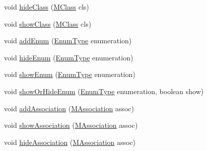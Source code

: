 \begin{DoxyCompactItemize}
\item 
void \hyperlink{classorg_1_1tzi_1_1use_1_1gui_1_1views_1_1diagrams_1_1classdiagram_1_1_class_diagram_a1577fd44a47429ed6e9f887f0862f0fa}{hide\-Class} (\hyperlink{interfaceorg_1_1tzi_1_1use_1_1uml_1_1mm_1_1_m_class}{M\-Class} cls)
\item 
void \hyperlink{classorg_1_1tzi_1_1use_1_1gui_1_1views_1_1diagrams_1_1classdiagram_1_1_class_diagram_a5be2f5b33a7a273dd7f2de6129a96c01}{show\-Class} (\hyperlink{interfaceorg_1_1tzi_1_1use_1_1uml_1_1mm_1_1_m_class}{M\-Class} cls)
\item 
void \hyperlink{classorg_1_1tzi_1_1use_1_1gui_1_1views_1_1diagrams_1_1classdiagram_1_1_class_diagram_a9186d695f60b6918f1328a4335e249bc}{add\-Enum} (\hyperlink{classorg_1_1tzi_1_1use_1_1uml_1_1ocl_1_1type_1_1_enum_type}{Enum\-Type} enumeration)
\item 
void \hyperlink{classorg_1_1tzi_1_1use_1_1gui_1_1views_1_1diagrams_1_1classdiagram_1_1_class_diagram_a3c12c7ce76b989ee03f865eade3e6d64}{hide\-Enum} (\hyperlink{classorg_1_1tzi_1_1use_1_1uml_1_1ocl_1_1type_1_1_enum_type}{Enum\-Type} enumeration)
\item 
void \hyperlink{classorg_1_1tzi_1_1use_1_1gui_1_1views_1_1diagrams_1_1classdiagram_1_1_class_diagram_a619da45fe25f8e7750393458f593e2c1}{show\-Enum} (\hyperlink{classorg_1_1tzi_1_1use_1_1uml_1_1ocl_1_1type_1_1_enum_type}{Enum\-Type} enumeration)
\item 
void \hyperlink{classorg_1_1tzi_1_1use_1_1gui_1_1views_1_1diagrams_1_1classdiagram_1_1_class_diagram_a58ba8a024fa94b14a9a02530dfb44671}{show\-Or\-Hide\-Enum} (\hyperlink{classorg_1_1tzi_1_1use_1_1uml_1_1ocl_1_1type_1_1_enum_type}{Enum\-Type} enumeration, boolean show)
\item 
void \hyperlink{classorg_1_1tzi_1_1use_1_1gui_1_1views_1_1diagrams_1_1classdiagram_1_1_class_diagram_adb6a9c8e5d9d201b14aa9b5af858f851}{add\-Association} (\hyperlink{interfaceorg_1_1tzi_1_1use_1_1uml_1_1mm_1_1_m_association}{M\-Association} assoc)
\item 
void \hyperlink{classorg_1_1tzi_1_1use_1_1gui_1_1views_1_1diagrams_1_1classdiagram_1_1_class_diagram_a0795854bd30efcd4add8bf47adc6819e}{show\-Association} (\hyperlink{interfaceorg_1_1tzi_1_1use_1_1uml_1_1mm_1_1_m_association}{M\-Association} assoc)
\item 
void \hyperlink{classorg_1_1tzi_1_1use_1_1gui_1_1views_1_1diagrams_1_1classdiagram_1_1_class_diagram_a7f3bad6b85bbe8905d510a8d8c51068e}{hide\-Association} (\hyperlink{interfaceorg_1_1tzi_1_1use_1_1uml_1_1mm_1_1_m_association}{M\-Association} assoc)

\end{DoxyCompactItemize}
